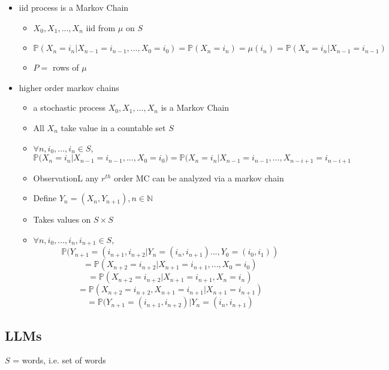 \documentclass{article}
\begin{document}
\begin{itemize}
    \item iid process is a Markov Chain
    \begin{itemize}
        \item $X_0, X_1, ..., X_n$ iid from $\mu$ on $S$
        \item $\mathbb{P}(X_n=i_n |  X_{n-1}=i_{n-1}, ... , X_0 = i_0) = \mathbb{P}(X_n = i_n)  = \mu(i_n) = \mathbb{P}(X_n=i_n | X_{n-1}=i_{n-1})$
        \item $P =$ rows of $\mu$
    \end{itemize}
    \item higher order markov chains
    \begin{itemize}
        \item a stochastic process $X_0, X_1, ..., X_n$ is a Markov Chain
        \item All $X_n$ take value in a countable set $S$
        \item $\forall n, i_0, ..., i_n \in S$, $$\mathbb{P}(X_n=i_n | X_{n-1}=i_{n-1}, ... , X_0 = i_0) = \mathbb{P}(X_n = i_n | X_{n-1}=i_{n-1}, ..., X_{n-i+1} = i_{n-i+1}$$
        \item ObservationL any $r^{th}$ order MC can be analyzed via a markov chain
    \item Define $Y_n=(X_{n}, Y_{n+1}), n \in \mathbb{N}$
    \item Takes values on $S\times S$
    \item $\forall n, i_0, ..., i_n, i_{n+1} \in S$, $$\mathbb{P}(Y_{n+1}=(i_{n+1}, i_{n+2} | Y_n = (i_n, i_{n+1}) ..., Y_0 = (i_0, i_1))$$
    $$= \mathbb{P}(X_{n+2}=i_{n+2} | X_{n+1}=i_{n+1}, ... , X_0 = i_0)$$
    $$= \mathbb{P}(X_{n+2}=i_{n+2} | X_{n+1}=i_{n+1},X_n = i_n)$$
    $$= \mathbb{P}(X_{n+2}=i_{n+2}, X_{n+1} = i_{n+1} | X_{n+1}=i_{n+1})$$
    $$= \mathbb{P}(Y_{n+1}=(i_{n+1}, i_{n+2}) | Y_{n}=(i_{n},i_{n+1})$$
    \end{itemize}
\end{itemize}

\subsection{LLMs}

$S$ = {words}, i.e. set of words
\end{document}
